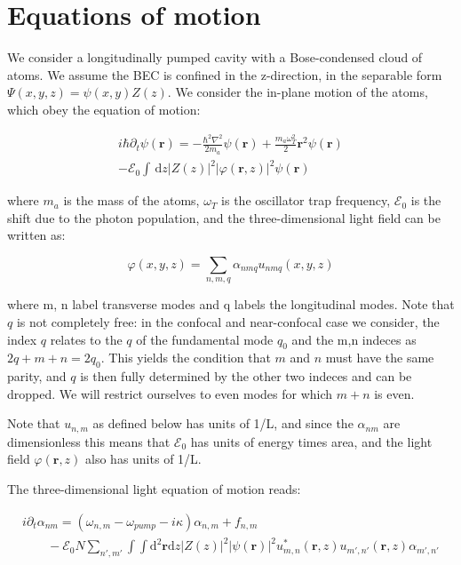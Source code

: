 \documentclass[a4paper,twocolumn,nobalancelastpage]{revtex4-1}
\newcommand{\vect}[1]{\mathbf{#1}}
\begin{document}
\section{Equations of motion}
\label{sec:eom-general}

We consider a longitudinally pumped cavity with a Bose-condensed cloud of atoms. We assume the BEC is confined in the z-direction, in the separable form $\Psi(x,y,z)=\psi(x,y)Z(z)$. 
We consider the in-plane motion of the atoms, which obey the equation of motion:

\begin{multline}
\label{eq:eqnpsifirst}
i\hbar \partial_t \psi(\vect{r})= -\frac{\hbar^2 \nabla^2}{2m_a}\psi(\vect{r})+ \frac{m_a \omega_T^2}{2} \vect{r}^2 \psi(\vect{r}) \\ - \mathcal{E}_0 
\int \, \mathrm{d}z |Z(z)|^2|\varphi(\vect{r},z)|^2 \psi(\vect{r})
\end{multline}

where $m_a$ is the mass of the atoms, $\omega_T$ is the oscillator trap frequency, $\mathcal{E}_0$ is the shift due to the photon population, and the three-dimensional light field can be written as:

\begin{equation}
\label{eq:fulllightfield}
\varphi(x,y,z)= \sum_{n,m,q} \alpha_{nmq} u_{nmq}(x,y,z)
\end{equation}

where m, n label transverse modes and q labels the longitudinal modes. Note that $q$ is not completely free: in the confocal and near-confocal case we consider, the index $q$ relates to the $q$ of the fundamental mode $q_0$ and the m,n indeces as $2q+m+n=2 q_0$. This yields the condition that $m$ and $n$ must have the same parity, and $q$ is then fully determined by the other two indeces and can be dropped. We will restrict ourselves to even modes for which $m+n$ is even.

Note that $u_{n,m}$ as defined below has units of 1/L, and since the $\alpha_{nm}$ are dimensionless this means that $\mathcal{E}_0$ has units of energy times area, and the light field $\varphi(\vect{r},z)$ also has units of 1/L. 

The three-dimensional light equation of motion reads: 

\begin{widetext}

\begin{multline}
\label{eq:eqnalphafirst}
 i\partial_t \alpha_{nm}=(\omega_{n,m}-\omega_{pump}-i\kappa)\alpha_{n,m}+f_{n,m} \\ \qquad - \mathcal{E}_0 N \sum_{n',m'} \int \int \mathrm{d}^2\vect{r} \mathrm{d}z |Z(z)|^2 |\psi(\vect{r})|^2 u^*_{m,n}(\vect{r},z) u_{m',n'}(\vect{r},z)\alpha_{m',n'}
\end{multline}

\end{widetext}
\end{document}
